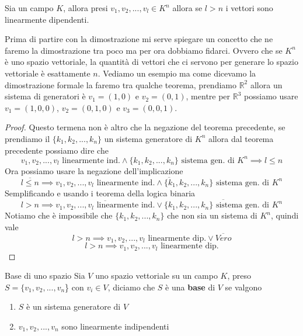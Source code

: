 \documentclass{rapport}
\begin{document}
\begin{teorema}{}{}
  Sia un campo $K$, allora presi $v_1, v_2, ..., v_l \in K^n$ allora se $l>n$ i vettori sono linearmente dipendenti. 
\end{teorema}
Prima di partire con la dimostrazione mi serve spiegare un concetto che ne faremo la dimostrazione tra poco ma per ora dobbiamo fidarci. Ovvero che se $K^n$ è uno spazio vettoriale, la quantità di vettori che ci servono per generare lo spazio vettoriale è esattamente $n$. Vediamo un esempio ma come dicevamo la dimostrazione formale la faremo tra qualche teorema, prendiamo $\mathbb{R}^2$ allora un sistema di generatori è $v_1=(1,0)$ e $v_2=(0,1)$, mentre per $\mathbb{R}^3$ possiamo usare $v_1=(1,0,0)$, $v_2=(0,1,0)$ e $v_3=(0,0,1)$.
\begin{proof}
  Questo termena non è altro che la negazione del teorema precedente, se prendiamo il $\{k_1, k_2, ..., k_n\}$ un sistema generatore di $K^n$ allora dal teorema precedente possiamo dire che 
  \[
  v_1, v_2, ..., v_l \text{ linearmente ind.} \land \{k_1, k_2, ..., k_n\} \text{ sistema gen. di } K^n \implies l \leq n
  \]
  Ora possiamo usare la negazione dell'implicazione
  \[
  \overline{l \leq n} \implies \overline{v_1, v_2, ..., v_l \text{ linearmente ind.} \land \{k_1, k_2, ..., k_n\} \text{ sistema gen. di } K^n }
  \]
  Semplificando e usando i teorema della logica binaria
  \[
  l  > n \implies \overline{v_1, v_2, ..., v_l \text{ linearmente ind.}} \lor \overline{\{k_1, k_2, ..., k_n\} \text{ sistema gen. di } K^n }
  \]
  Notiamo che è impossibile che $\{k_1, k_2, ..., k_n\}$ che non sia un sistema di $K^n$, quindi vale 
  \[
  l  > n \implies v_1, v_2, ..., v_l \text{ linearmente dip.} \lor \overline{Vero}
  \]
  \[
  l  > n \implies v_1, v_2, ..., v_l \text{ linearmente dip.}
  \]
\end{proof}
\begin{definizione}{Base di uno spazio}{}
  Sia $V$ uno spazio vettoriale su un campo $K$, preso $S = \{v_1, v_2, ..., v_n$\}  con $v_i \in V$, diciamo che $S$ è una \textbf{base} di $V$ se valgono 
  \begin{center}
    
  \begin{enumerate}
    \centering
    \item $S$ è un sistema generatore di $V$
    \item $v_1, v_2, ..., v_n$ sono linearmente indipendenti
  \end{enumerate} 
\end{center}
  \end{definizione}
\end{document}
